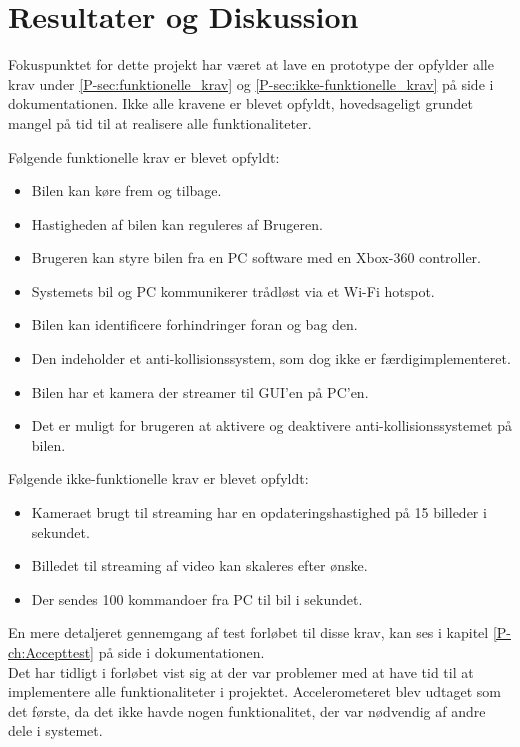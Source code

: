 \chapter{Resultater og Diskussion} \label{ch:Resultater_og_diskussion}

Fokuspunktet for dette projekt har været at lave en prototype der opfylder alle krav under \ref{P-sec:funktionelle_krav}  og \ref{P-sec:ikke-funktionelle_krav}  på side \pageref{P-sec:funktionelle_krav} i dokumentationen. 
Ikke alle kravene er blevet opfyldt, hovedsageligt grundet mangel på tid til at realisere alle funktionaliteter.

Følgende funktionelle krav er blevet opfyldt:
\begin{itemize}
	\item Bilen kan køre frem og tilbage. 
	\item Hastigheden af bilen kan reguleres af Brugeren. 
	\item Brugeren kan styre bilen fra en PC software med en Xbox-360 controller. 			\item Systemets bil og PC kommunikerer trådløst via et Wi-Fi hotspot.
	\item Bilen kan identificere forhindringer foran og bag den. 
	\item Den indeholder et anti-kollisionssystem, som dog ikke er færdigimplementeret. 
	\item Bilen har et kamera der streamer til GUI'en på PC'en. 
	\item Det er muligt for brugeren at aktivere og deaktivere anti-kollisionssystemet på bilen.
\end{itemize}

Følgende ikke-funktionelle krav er blevet opfyldt: 
\begin{itemize}
	\item Kameraet brugt til streaming har en opdateringshastighed på 15 billeder i sekundet. 
	\item Billedet til streaming af video kan skaleres efter ønske. 
	\item Der sendes 100 kommandoer fra PC til bil i sekundet.
\end{itemize}

En mere detaljeret gennemgang af test forløbet til disse krav, kan ses i kapitel \ref{P-ch:Accepttest}  på side \pageref{P-ch:Accepttest} i dokumentationen.\\

Det har tidligt i forløbet vist sig at der var problemer med at have tid til at implementere alle funktionaliteter i projektet. Accelerometeret blev udtaget som det første, da det ikke havde nogen funktionalitet, der var nødvendig af andre dele i systemet.

